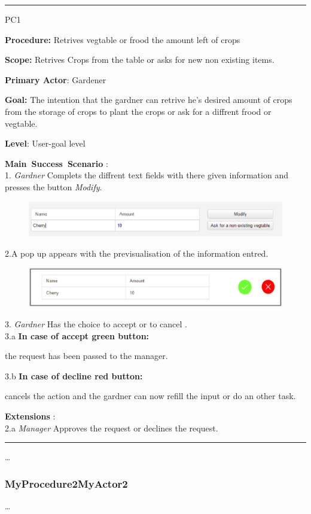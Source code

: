 \vspace{0.5cm}
\hrule
\hfill \break
\begin{lyxlist}{PC1}
\small{
\item [\textbf{Procedure:}] Retrives vegtable or
frood the amount left of crops
\item [\textbf{Scope:}] Retrives Crops from the table or asks for new non
existing items.
\item [\textbf{Primary Actor}:] Gardener
\item [\textbf{Goal:}] The intention that the gardner can retrive he's desired
amount of crops from the storage of crops to plant the crops or ask for a
diffrent frood or vegtable.
\item [\textbf{Level}:] User-goal level
\item [\textbf{Main~Success~Scenario}]:\\
1. \emph{Gardner} Complets the diffrent text fields with there given
information and presses the button \emph{Modify}. \\
\begin{figure}
\includegraphics[width=1\textwidth]{images/RetriveCropsBase.eps}
\end{figure}
2.A pop up appears with the previsualisation of the information entred.\\
\begin{figure}
\includegraphics[width=1\textwidth]{images/PopUpRetrive.eps}
\end{figure}
3. \emph{Gardner} Has the choice to accept or to cancel .\\
	3.a \textbf{In case of accept green button:}
		\begin{Tab}{2em}  the request has been passed to the manager.\end{Tab}
	3.b \textbf{In case of decline red button:}
		\begin{Tab}{2em} cancels the action and the gardner can
		now refill the input or do an other task. \end{Tab}
\item [\textbf{Extensions}]:\\
2.a  \emph{Manager} Approves the request or declines the request.\\
}
\end{lyxlist}
\hrule
\vspace{0.5cm}

\ldots

\subsubsection{MyProcedure2MyActor2}
\ldots















